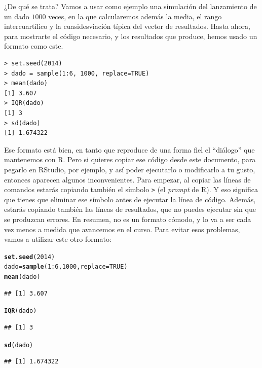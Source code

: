 \documentclass[10pt,a4paper]{article}\usepackage[]{graphicx}\usepackage[]{color}
\makeatletter
\newcommand{\hlnum}[1]{\textcolor[rgb]{0.686,0.059,0.569}{#1}}%
\newcommand{\hlopt}[1]{\textcolor[rgb]{0,0,0}{#1}}%
\newcommand{\hlstd}[1]{\textcolor[rgb]{0.345,0.345,0.345}{#1}}%
\newcommand{\hlkwb}[1]{\textcolor[rgb]{0.69,0.353,0.396}{#1}}%
\newcommand{\hlkwc}[1]{\textcolor[rgb]{0.333,0.667,0.333}{#1}}%
\newcommand{\hlkwd}[1]{\textcolor[rgb]{0.737,0.353,0.396}{\textbf{#1}}}%
\newenvironment{kframe}{%
 \def\at@end@of@kframe{}%
 \ifinner\ifhmode%
  \def\at@end@of@kframe{\end{minipage}}%
  \begin{minipage}{\columnwidth}%
 \fi\fi%
 \def\FrameCommand##1{\hskip\@totalleftmargin \hskip-\fboxsep
 \colorbox{shadecolor}{##1}\hskip-\fboxsep
     \hskip-\linewidth \hskip-\@totalleftmargin \hskip\columnwidth}%
 \MakeFramed {\advance\hsize-\width
   \@totalleftmargin\z@ \linewidth\hsize
   \@setminipage}}%
 {\par\unskip\endMakeFramed%
 \at@end@of@kframe}
\newenvironment{knitrout}{}{} %
\makeatother
\begin{document}
¿De qué se trata? Vamos a usar como ejemplo una simulación del lanzamiento de un dado $1000$ veces, en la que calcularemos además la media, el rango intercuartílico y la cuasidesviación típica del vector de resultados. Hasta ahora, para mostrarte el código necesario, y los resultados que produce, hemos usado un formato como este.
\begin{verbatim}
> set.seed(2014)
> dado = sample(1:6, 1000, replace=TRUE)
> mean(dado)
[1] 3.607
> IQR(dado)
[1] 3
> sd(dado)
[1] 1.674322
\end{verbatim}
Ese formato está bien, en tanto que reproduce de una forma fiel el ``diálogo'' que mantenemos con R. Pero si quieres copiar ese código desde este documento, para pegarlo en RStudio, por ejemplo, y así poder ejecutarlo o modificarlo a tu gusto, entonces aparecen algunos inconvenientes. Para empezar, al copiar las líneas de comandos estarás copiando también el símbolo {\tt >} (el {\em prompt} de R). Y eso significa que tienes que eliminar ese símbolo antes de ejecutar la línea de código. Además, estarás copiando también las líneas de resultados, que no puedes ejecutar sin que se produzcan errores. En resumen, no es un formato cómodo, y lo va a ser cada vez menos a medida que avancemos en el curso. Para evitar esos problemas, vamos a utilizar este otro formato:
\begin{knitrout}
\color{fgcolor}\begin{kframe}
\begin{alltt}
\hlkwd{set.seed}\hlstd{(}\hlnum{2014}\hlstd{)}
\hlstd{dado} \hlkwb{=} \hlkwd{sample}\hlstd{(}\hlnum{1}\hlopt{:}\hlnum{6}\hlstd{,} \hlnum{1000}\hlstd{,} \hlkwc{replace}\hlstd{=}\hlnum{TRUE}\hlstd{)}
\hlkwd{mean}\hlstd{(dado)}
\end{alltt}
\begin{verbatim}
## [1] 3.607
\end{verbatim}
\begin{alltt}
\hlkwd{IQR}\hlstd{(dado)}
\end{alltt}
\begin{verbatim}
## [1] 3
\end{verbatim}
\begin{alltt}
\hlkwd{sd}\hlstd{(dado)}
\end{alltt}
\begin{verbatim}
## [1] 1.674322
\end{verbatim}
\end{kframe}
\end{knitrout}
\end{document}
